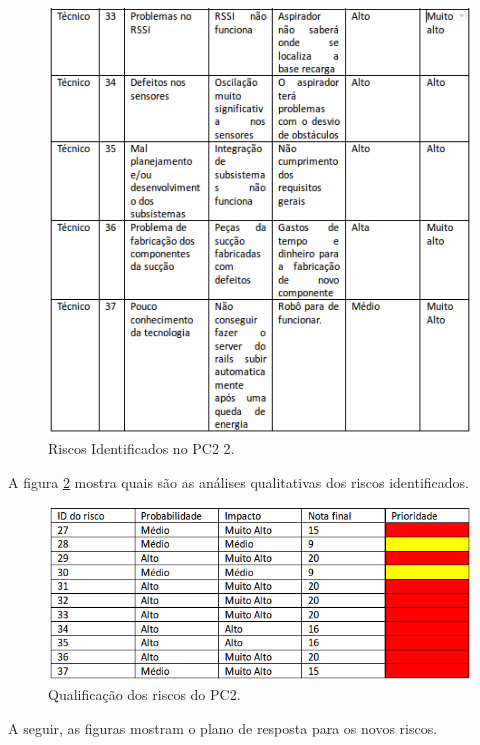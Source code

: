 \begin{figure}[H]
	\centering
	\includegraphics[scale=1]{figuras/riscos_pc2_2.png}
	\caption{Riscos Identificados no PC2 2.}
	\label{img:riscospc22}
\end{figure}

A figura \ref{img:qualitativoriscospc2} mostra quais são as análises qualitativas dos riscos identificados.

\begin{figure}[H]
	\centering
	\includegraphics[scale=0.5]{figuras/riscosQualitativopc2.png}
	\caption{Qualificação dos riscos do PC2.}
	\label{img:qualitativoriscospc2}
\end{figure}

A seguir, as figuras mostram o plano de resposta para os novos riscos.

